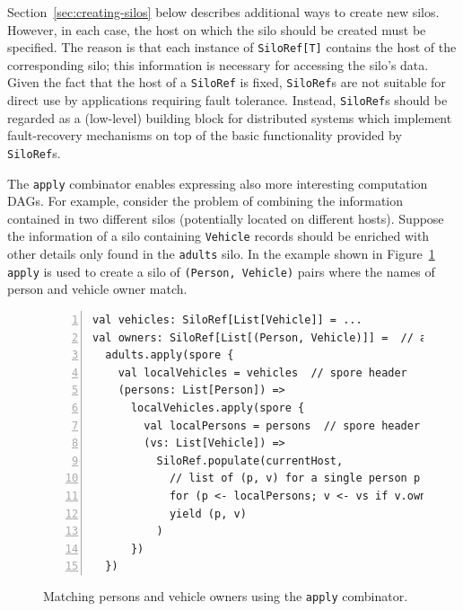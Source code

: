 \documentclass{jfp1}
\begin{document}
Section~\ref{sec:creating-silos} below describes additional ways to
create new silos. However, in each case, the host on which the silo
should be created must be specified. The reason is that each instance
of \verb|SiloRef[T]| contains the host of the corresponding silo; this
information is necessary for accessing the silo's data.  Given the
fact that the host of a \verb|SiloRef| is fixed, \verb|SiloRef|s are
not suitable for direct use by applications requiring fault
tolerance. Instead, \verb|SiloRef|s should be regarded as a
(low-level) building block for distributed systems which implement
fault-recovery mechanisms on top of the basic functionality provided
by \verb|SiloRef|s.

The \verb|apply| combinator enables expressing also more interesting
computation DAGs. For example, consider the problem of combining the
information contained in two different silos (potentially located on
different hosts). Suppose the information of a silo containing
\verb|Vehicle| records should be enriched with other details only
found in the \verb|adults| silo. In the example shown in Figure~\ref{fig:apply} \verb|apply| is
used to create a silo of \verb|(Person, Vehicle)| pairs where the
names of person and vehicle owner match.


\begin{figure}
\centering
\begin{lstlisting}[numbers=left,xleftmargin=2em,framexleftmargin=1.5em]
val vehicles: SiloRef[List[Vehicle]] = ...
val owners: SiloRef[List[(Person, Vehicle)]] =  // adults that own a vehicle
  adults.apply(spore {
    val localVehicles = vehicles  // spore header
    (persons: List[Person]) =>
      localVehicles.apply(spore {
        val localPersons = persons  // spore header
        (vs: List[Vehicle]) =>
          SiloRef.populate(currentHost,
            // list of (p, v) for a single person p
            for (p <- localPersons; v <- vs if v.owner.name == p.name)
            yield (p, v)
          )
      })
  })
\end{lstlisting}
\caption{Matching persons and vehicle owners using the \texttt{apply} combinator.}\label{fig:apply}
\end{figure}
\end{document}
